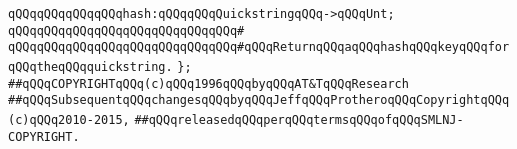 \newline
\verb|qQQqqQQqqQQqqQQqhash:qQQqqQQqQuickstringqQQq->qQQqUnt;|\newline
\verb|qQQqqQQqqQQqqQQqqQQqqQQqqQQqqQQq#|\newline
\verb|qQQqqQQqqQQqqQQqqQQqqQQqqQQqqQQq#qQQqReturnqQQqaqQQqhashqQQqkeyqQQqforqQQqtheqQQqquickstring.|\newline
\newline
\verb|};|\newline
\newline
\newline
\verb|##qQQqCOPYRIGHTqQQq(c)qQQq1996qQQqbyqQQqAT&TqQQqResearch|\newline
\verb|##qQQqSubsequentqQQqchangesqQQqbyqQQqJeffqQQqProtheroqQQqCopyrightqQQq(c)qQQq2010-2015,|\newline
\verb|##qQQqreleasedqQQqperqQQqtermsqQQqofqQQqSMLNJ-COPYRIGHT.|\newline

